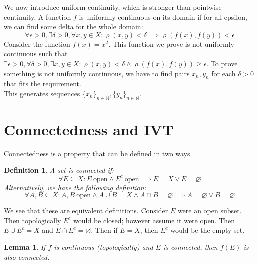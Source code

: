 \documentclass{exam}
\newtheorem{lem}{Lemma}[section]
\newtheorem{defn}{Definition}[section]
\begin{document}
We now introduce uniform continuity, which is stronger than pointwise continuity. A function $f$ is uniformly continuous on its domain if for all epsilon, we can find some delta for the whole domain:
\begin{equation*}
  \forall \epsilon > 0, \exists \delta > 0, \forall x, y \in X: \varrho(x, y) < \delta \implies \varrho(f(x), f(y)) < \epsilon
\end{equation*}
Consider the function $f(x) = x^2$. This function we prove is not uniformly continuous such that $\exists \epsilon > 0, \forall \delta > 0, \exists x, y \in X: \varrho(x, y) < \delta \land \varrho(f(x), f(y)) \geqslant \epsilon$. To prove something is not uniformly continuous, we have to find pairs $x_n, y_n$ for each $\delta > 0$ that fits the requirement.\\

This generates sequences $\{x_n\}_{n \in \mathbb{N}}, \{y_n\}_{n \in \mathbb{N}}$.

\pagebreak
\section*{Connectedness and IVT}
Connectedness is a property that can be defined in two ways.
\begin{defn}
A set is connected if: 
\begin{equation*}
  \forall E \subseteq X: E \ \text{open} \land E^c \ \text{open} \implies E = X \lor E = \varnothing
\end{equation*}
Alternatively, we have the following definition:
\begin{equation*}
  \forall A, B \subseteq X: A, B \ \text{open} \land A \cup B = X \land A \cap B = \varnothing \implies A = \varnothing \lor B = \varnothing
\end{equation*}
\end{defn}
We see that these are equivalent definitions. Consider $E$ were an open subset. Then topologically $E^c$ would be closed; however assume it were open. Then $E \cup E^c = X$ and $E \cap E^c = \varnothing$. Then if $E = X$, then $E^c$ would be the empty set.\\

\begin{lem}
If $f$ is continuous (topologically) and $E$ is connected, then $f(E)$ is also connected.
\end{lem}
\end{document}
